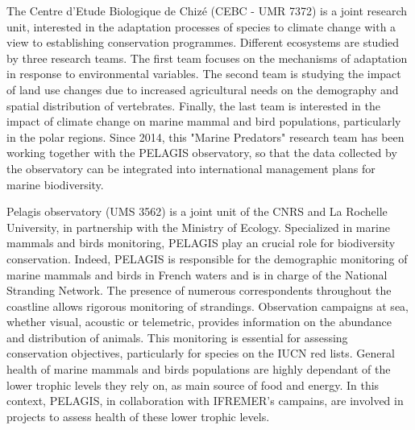 
The Centre d'Etude Biologique de Chizé (CEBC - UMR 7372) is a joint research unit, interested in the adaptation processes of species to climate change with a view to establishing conservation programmes. Different ecosystems are studied by three research teams. The first team focuses on the mechanisms of adaptation in response to environmental variables. The second team is studying the impact of land use changes due to increased agricultural needs on the demography and spatial distribution of vertebrates. Finally, the last team is interested in the impact of climate change on marine mammal and bird populations, particularly in the polar regions. Since 2014, this "Marine Predators" research team has been working together with the PELAGIS observatory, so that the data collected by the observatory can be integrated into international management plans for marine biodiversity.  

Pelagis observatory (UMS 3562) is a joint unit of the CNRS and La Rochelle University, in partnership with the Ministry of Ecology. Specialized in marine mammals and birds monitoring, PELAGIS play an crucial role for biodiversity conservation. Indeed, PELAGIS is responsible for the demographic monitoring of marine mammals and birds in French waters and is in charge of the National Stranding Network. The presence of numerous correspondents throughout the coastline allows rigorous monitoring of strandings. Observation campaigns at sea, whether visual, acoustic or telemetric, provides information on the abundance and distribution of animals. This monitoring is essential for assessing conservation objectives, particularly for species on the IUCN red lists. General health of marine mammals and birds populations are highly dependant of the lower trophic levels they rely on, as main source of food and energy. In this context, PELAGIS, in collaboration with IFREMER's campains, are involved in projects to assess health of these lower trophic levels. 